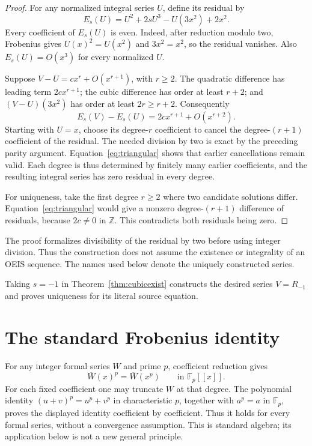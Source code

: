 \documentclass[11pt,a4paper]{article}
\theoremstyle{remark}
\newcommand{\Z}{\mathbb Z}
\newcommand{\F}{\mathbb F}
\begin{document}
\begin{proof}
For any normalized integral series $U$, define its residual by
\[
E_s(U)=U^2+2sU^3-U(3x^2)+2x^2.
\]
Every coefficient of $E_s(U)$ is even. Indeed, after reduction modulo
two, Frobenius gives $U(x)^2=U(x^2)$ and $3x^2=x^2$, so the residual
vanishes. Also $E_s(U)=O(x^3)$ for every normalized $U$.

Suppose $V-U=cx^r+O(x^{r+1})$, with $r\ge2$. The quadratic difference
has leading term $2cx^{r+1}$; the cubic difference has order at least
$r+2$; and $(V-U)(3x^2)$ has order at least $2r\ge r+2$.
Consequently
\begin{equation}\label{eq:triangular}
E_s(V)-E_s(U)=2cx^{r+1}+O(x^{r+2}).
\end{equation}
Starting with $U=x$, choose its degree-$r$ coefficient to cancel the
degree-$(r+1)$ coefficient of the residual. The needed division by two
is exact by the preceding parity argument. Equation~\eqref{eq:triangular}
shows that earlier cancellations remain valid. Each degree is thus
determined by finitely many earlier coefficients, and the resulting
integral series has zero residual in every degree.

For uniqueness, take the first degree $r\ge2$ where two candidate
solutions differ. Equation~\eqref{eq:triangular} would give a nonzero
degree-$(r+1)$ difference of residuals, because $2c\ne0$ in $\Z$.
This contradicts both residuals being zero.
\end{proof}

The proof formalizes divisibility of the residual by two before using
integer division. Thus the construction does not assume the existence
or integrality of an OEIS sequence. The names used below denote the
uniquely constructed series.


Taking $s=-1$ in Theorem~\ref{thm:cubicexist} constructs the desired
series $V=R_{-1}$ and proves uniqueness for its literal source equation.
\section{The standard Frobenius identity}
For any integer formal series $W$ and prime $p$, coefficient reduction gives
\[
\overline W(x)^p=\overline W(x^p)\qquad\text{in }\F_p[[x]].
\]
For each fixed coefficient one may truncate $W$ at that degree. The
polynomial identity $(u+v)^p=u^p+v^p$ in characteristic $p$, together
with $a^p=a$ in $\F_p$, proves the displayed identity coefficient by
coefficient. Thus it holds for every formal series, without a convergence
assumption. This is standard algebra; its application below is not a new
general principle.
\end{document}
